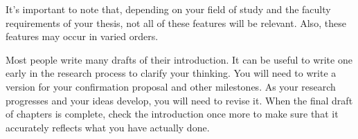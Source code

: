 It’s important to note that, depending on your field of study and the faculty
requirements of your thesis, not all of these features will be relevant. Also,
these features may occur in varied orders.

Most people write many drafts of their introduction. It can be useful to write
one early in the research process to clarify your thinking. You will need to
write a version for your confirmation proposal and other milestones. As your
research progresses and your ideas develop, you will need to revise it. When
the final draft of chapters is complete, check the introduction once more to
make sure that it accurately reflects what you have actually done.

